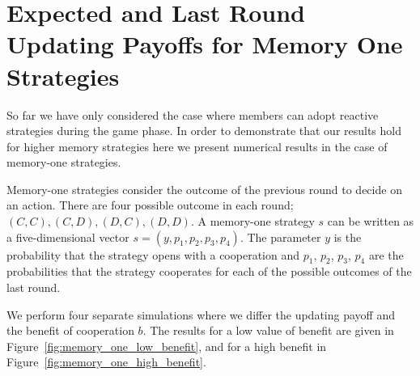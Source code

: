 \documentclass[11pt]{article}
\theoremstyle{plainCl1}
\theoremstyle{plainCl2}
\begin{document}
\section{Expected and Last Round Updating Payoffs for Memory One Strategies}

So far we have only considered the case where members can adopt reactive
strategies during the game phase. In order to demonstrate that our results hold
for higher memory strategies here we present numerical results in the case of
memory-one strategies.

Memory-one strategies consider the outcome of the previous round to decide on an
action. There are four possible outcome in each round; \((C, C), (C, D), (D, C),
(D, D)\). A memory-one strategy \(s\) can be written as a five-dimensional
vector \(s=(y, p_1, p_2, p_3, p_4)\). The parameter \(y\) is the probability
that the strategy opens with a cooperation and \(p_1\), \(p_2\), \(p_3\),
\(p_4\) are the probabilities that the strategy cooperates for each of the
possible outcomes of the last round.

We perform four separate simulations where we differ the updating payoff and the
benefit of cooperation \(b\). The results for a low value of benefit are given
in Figure~\ref{fig:memory_one_low_benefit}, and for a high benefit in
Figure~\ref{fig:memory_one_high_benefit}.
\end{document}
